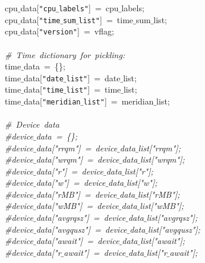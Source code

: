 \mbox{}\ \ \ \ \ \ cpu$\_$data[\texttt{"{}cpu$\_$labels"{}}]\ =\ cpu$\_$labels; \\
\mbox{}\ \ \ \ \ \ cpu$\_$data[\texttt{"{}time$\_$sum$\_$list"{}}]\ =\ time$\_$sum$\_$list; \\
\mbox{}\ \ \ \ \ \ cpu$\_$data[\texttt{"{}version"{}}]\ =\ vflag; \\
\mbox{}\ \ \ \ \ \  \\
\mbox{}\ \ \ \ \ \ \textit{\#\ Time\ dictionary\ for\ pickling:} \\
\mbox{}\ \ \ \ \ \ time$\_$data\ =\ \{\}; \\
\mbox{}\ \ \ \ \ \ time$\_$data[\texttt{"{}date$\_$list"{}}]\ =\ date$\_$list; \\
\mbox{}\ \ \ \ \ \ time$\_$data[\texttt{"{}time$\_$list"{}}]\ =\ time$\_$list; \\
\mbox{}\ \ \ \ \ \ time$\_$data[\texttt{"{}meridian$\_$list"{}}]\ =\ meridian$\_$list; \\
\mbox{}\ \ \ \ \ \  \\
\mbox{}\ \ \ \ \ \ \textit{\#\ Device\ data} \\
\mbox{}\ \ \ \ \ \ \textit{\#device$\_$data\ =\ \{\};} \\
\mbox{}\ \ \ \ \ \ \textit{\#device$\_$data["{}rrqm"{}]\ =\ device$\_$data$\_$list["{}rrqm"{}];} \\
\mbox{}\ \ \ \ \ \ \textit{\#device$\_$data["{}wrqm"{}]\ =\ device$\_$data$\_$list["{}wrqm"{}];} \\
\mbox{}\ \ \ \ \ \ \textit{\#device$\_$data["{}r"{}]\ =\ device$\_$data$\_$list["{}r"{}];} \\
\mbox{}\ \ \ \ \ \ \textit{\#device$\_$data["{}w"{}]\ =\ device$\_$data$\_$list["{}w"{}];} \\
\mbox{}\ \ \ \ \ \ \textit{\#device$\_$data["{}rMB"{}]\ =\ device$\_$data$\_$list["{}rMB"{}];} \\
\mbox{}\ \ \ \ \ \ \textit{\#device$\_$data["{}wMB"{}]\ =\ device$\_$data$\_$list["{}wMB"{}];} \\
\mbox{}\ \ \ \ \ \ \textit{\#device$\_$data["{}avgrqsz"{}]\ =\ device$\_$data$\_$list["{}avgrqsz"{}];} \\
\mbox{}\ \ \ \ \ \ \textit{\#device$\_$data["{}avgqusz"{}]\ =\ device$\_$data$\_$list["{}avgqusz"{}];} \\
\mbox{}\ \ \ \ \ \ \textit{\#device$\_$data["{}await"{}]\ =\ device$\_$data$\_$list["{}await"{}];} \\
\mbox{}\ \ \ \ \ \ \textit{\#device$\_$data["{}r$\_$await"{}]\ =\ device$\_$data$\_$list["{}r$\_$await"{}];} \\
